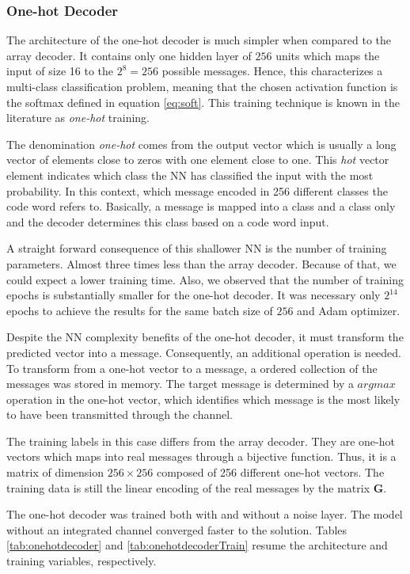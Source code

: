 \documentclass[conference]{IEEEtran}
\begin{document}
\subsubsection{One-hot Decoder}

The architecture of the one-hot decoder is much simpler when compared to the array decoder. It contains only one hidden layer of $256$ units which maps the input of size 16 to the $2^8=256$ possible messages. Hence, this characterizes a multi-class classification problem, meaning that the chosen activation function is the softmax defined in equation \eqref{eq:soft}. This training technique is known in the literature as \textit{one-hot} training. 

The denomination \textit{one-hot} comes from the output vector which is usually a long vector of elements close to zeros with one element close to one. This \textit{hot} vector element indicates which class the NN has classified the input with the most probability. In this context, which message encoded in 256 different classes the code word refers to. Basically, a message is mapped into a class and a class only and the decoder determines this class based on a code word input.

A straight forward consequence of this shallower NN is the number of training parameters. Almost three times less than the array decoder. Because of that, we could expect a lower training time. Also, we observed that the number of training epochs is substantially smaller for the one-hot decoder. It was necessary only $2^{14}$ epochs to achieve the results for the same batch size of $256$ and Adam optimizer.

Despite the NN complexity benefits of the one-hot decoder, it must transform the predicted vector into a message. Consequently, an additional operation is needed. To transform from a one-hot vector to a message, a ordered collection of the messages was stored in memory. The target message is determined by a $argmax$ operation in the one-hot vector, which identifies which message is the most likely to have been transmitted through the channel.

The training labels in this case differs from the array decoder. They are one-hot vectors which maps into real messages through a bijective function. Thus, it is a matrix of dimension $256\times256$ composed of 256 different one-hot vectors. The training data is still the linear encoding of the real messages by the matrix $\textbf{G}$. 

The one-hot decoder was trained both with and without a noise layer. The model without an integrated channel converged faster to the solution. Tables \ref{tab:onehotdecoder} and \ref{tab:onehotdecoderTrain} resume the architecture and training variables, respectively.
\end{document}
